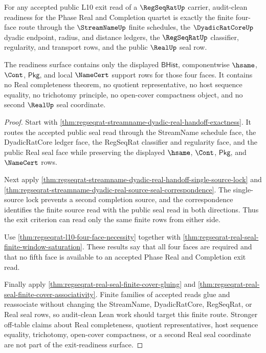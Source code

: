 \begin{theorem}
\label{thm:regseqrat-streamname-dyadic-real-audit-clean-exit-readiness}
For any accepted public L10 exit read of a $\RegSeqRatUp$ carrier, audit-clean
readiness for the Phase Real and Completion quartet is exactly the finite
four-face route through the $\StreamNameUp$ finite schedules, the
$\DyadicRatCoreUp$ dyadic endpoint, radius, and distance ledgers, the
$\RegSeqRatUp$ classifier, regularity, and transport rows, and the public
$\RealUp$ seal row.

The readiness surface contains only the displayed $\mathsf{BHist}$,
componentwise $\hsame$, $\Cont$, $\mathsf{Pkg}$, and local $\NameCert$ support
rows for those four faces. It contains no Real completeness theorem, no quotient
representative, no host sequence equality, no trichotomy principle, no
open-cover compactness object, and no second $\RealUp$ seal coordinate.
\end{theorem}
\begin{proof}
Start with
\autoref{thm:regseqrat-streamname-dyadic-real-handoff-exactness}. It routes the
accepted public seal read through the StreamName schedule face, the DyadicRatCore
ledger face, the RegSeqRat classifier and regularity face, and the public Real
seal face while preserving the displayed $\hsame$, $\Cont$, $\mathsf{Pkg}$, and
$\NameCert$ rows.

Next apply
\autoref{thm:regseqrat-streamname-dyadic-real-handoff-single-source-lock} and
\autoref{thm:regseqrat-streamname-dyadic-real-source-seal-correspondence}. The
single-source lock prevents a second completion source, and the correspondence
identifies the finite source read with the public seal read in both directions.
Thus the exit criterion can read only the same finite rows from either side.

Use \autoref{thm:regseqrat-l10-four-face-necessity} together with
\autoref{thm:regseqrat-real-seal-finite-window-saturation}. These results say
that all four faces are required and that no fifth face is available to an
accepted Phase Real and Completion exit read.

Finally apply \autoref{thm:regseqrat-real-seal-finite-cover-gluing} and
\autoref{thm:regseqrat-real-seal-finite-cover-associativity}. Finite families of
accepted reads glue and reassociate without changing the StreamName,
DyadicRatCore, RegSeqRat, or Real seal rows, so audit-clean Lean work should
target this finite route. Stronger off-table claims about Real completeness,
quotient representatives, host sequence equality, trichotomy, open-cover
compactness, or a second Real seal coordinate are not part of the exit-readiness
surface.
\end{proof}

